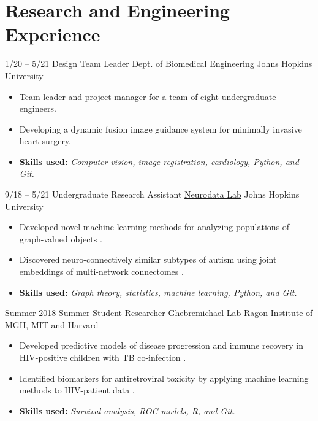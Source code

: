 \section{Research and Engineering Experience}
\cventry
{1/20 -- 5/21}
{Design Team Leader}
{\href{https://cbid.bme.jhu.edu/academics/undergraduate-studies/}{Dept. of Biomedical Engineering}}
{Johns Hopkins University}
{}
{
\begin{itemize}
    \item Team leader and project manager for a team of eight undergraduate engineers.
    \item Developing a dynamic fusion image guidance system for minimally invasive heart surgery.
    \item \textbf{Skills used:} \textit{Computer vision, image registration, cardiology, Python, and Git.}
\end{itemize}{}
}

\cventry
{9/18 -- 5/21}
{Undergraduate Research Assistant}
{\href{https://neurodata.io}{Neurodata Lab}}
{Johns Hopkins University}
{}
{
\begin{itemize}
    \item Developed novel machine learning methods for analyzing populations of graph-valued objects \cite{gopalakrishnanMultiscaleComparativeConnectomics2020, chungStatisticalConnectomics2020b}.
    \item Discovered neuro-connectively similar subtypes of autism using joint embeddings of multi-network connectomes \cite{wangVariabilityHeritabilityMouse2020, gopalakrishnanBMES2019}.
    \item \textbf{Skills used:} \textit{Graph theory, statistics, machine learning, Python, and Git.}
\end{itemize}
}

\cventry
{Summer 2018}
{Summer Student Researcher}
{\href{http://www.ragoninstitute.org/portfolio-item/ghebremichael/}{Ghebremichael Lab}}
{Ragon Institute of MGH, MIT and Harvard}
{}
{
\begin{itemize}
    \item Developed predictive models of disease progression and immune recovery in HIV-positive children with TB co-infection \cite{gopalakrishnanPreHAARTCD4Tlymphocytes2020}.
    \item Identified biomarkers for antiretroviral toxicity by applying machine learning methods to HIV-patient data \cite{leeComparisonMachineLearning2019a}.
    \item \textbf{Skills used:} \textit{Survival analysis, ROC models, R, and Git.}
\end{itemize}{}
}

